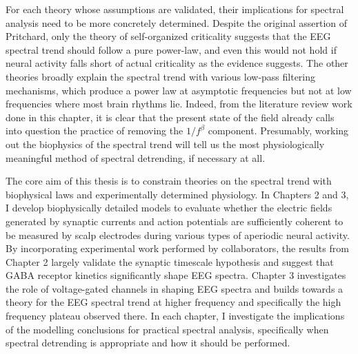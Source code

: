 For each theory whose assumptions are validated, their implications for spectral analysis need to be more concretely determined. Despite the original assertion of Pritchard, only the theory of self-organized criticality suggests that the EEG spectral trend should follow a pure power-law, and even this would not hold if neural activity falls short of actual criticality as the evidence suggests. The other theories broadly explain the spectral trend with various low-pass filtering mechanisms, which produce a power law at asymptotic frequencies but not at low frequencies where most brain rhythms lie. Indeed, from the literature review work done in this chapter, it is clear that the present state of the field already calls into question the practice of removing the $1/f^\beta$ component. Presumably, working out the biophysics of the spectral trend will tell us the most physiologically meaningful method of spectral detrending, if necessary at all.

The core aim of this thesis is to constrain theories on the spectral trend with biophysical laws and experimentally determined physiology. In Chapters 2 and 3, I develop biophysically detailed models to evaluate whether the electric fields generated by synaptic currents and action potentials are sufficiently coherent to be measured by scalp electrodes during various types of aperiodic neural activity. By incorporating experimental work performed by collaborators, the results from Chapter 2 largely validate the synaptic timescale hypothesis and suggest that GABA receptor kinetics significantly shape EEG spectra. Chapter 3 investigates the role of voltage-gated channels in shaping EEG spectra and builds towards a theory for the EEG spectral trend at higher frequency and specifically the high frequency plateau observed there. In each chapter, I investigate the implications of the modelling conclusions for practical spectral analysis, specifically when spectral detrending is appropriate and how it should be performed.